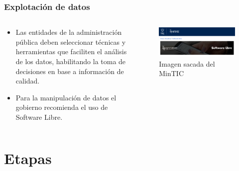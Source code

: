 \begin{frame}[allowframebreaks]

  \frametitle{Explotación de datos}

  \begin{columns}
    \begin{column}{.5\textwidth}
      \begin{itemize}
        \item Las entidades de la administración pública deben seleccionar técnicas y herramientas que faciliten el análisis de los datos, habilitando la toma de decisiones en base a información de calidad.
        \item Para la manipulación de datos el gobierno recomienda el uso de Software Libre.
      \end{itemize}  
    \end{column}

    \begin{column}{.5\textwidth}
      \begin{figure}[ht]
        \centering
        \includegraphics[width=\textwidth]{img/SoftwareLibre.png}
        \caption{Imagen sacada del MinTIC\cite{MinTIC_SoftwareLibre}}
      \end{figure}

    \end{column}
  \end{columns}


\end{frame}


\section{Etapas}

\insertsectionpage


